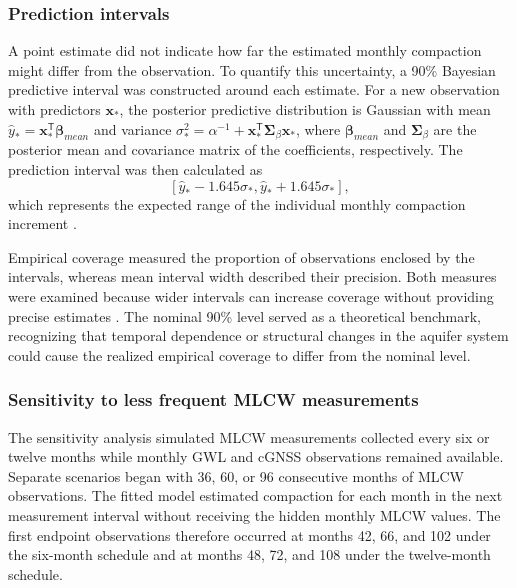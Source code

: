 \subsubsection{Prediction intervals}
\label{subsec:uncertainty}

A point estimate did not indicate how far the estimated monthly compaction might differ from the observation. To quantify this uncertainty, a 90\% Bayesian predictive interval was constructed around each estimate. For a new observation with predictors $\boldsymbol{x}_{*}$, the posterior predictive distribution is Gaussian with mean $\widehat{y}_{*} = \boldsymbol{x}_{*}^{\mathsf{T}}\boldsymbol{\beta}_{mean}$ and variance $\sigma_{*}^{2} = \alpha^{-1} + \boldsymbol{x}_{*}^{\mathsf{T}}\boldsymbol{\Sigma}_{\beta}\boldsymbol{x}_{*}$, where $\boldsymbol{\beta}_{mean}$ and $\boldsymbol{\Sigma}_{\beta}$ are the posterior mean and covariance matrix of the coefficients, respectively. The prediction interval was then calculated as
\begin{equation}
\left[
\widehat{y}_{*}-1.645\sigma_{*},
\widehat{y}_{*}+1.645\sigma_{*}
\right],
\label{eq:prediction_interval}
\end{equation}
which represents the expected range of the individual monthly compaction increment \citep{mackay_bayesian_1992}.

Empirical coverage measured the proportion of observations enclosed by the intervals, whereas mean interval width described their precision. Both measures were examined because wider intervals can increase coverage without providing precise estimates \citep{singh_uncertainty_2024}. The nominal 90\% level served as a theoretical benchmark, recognizing that temporal dependence or structural changes in the aquifer system could cause the realized empirical coverage to differ from the nominal level.

\subsubsection{Sensitivity to less frequent MLCW measurements}
\label{subsec:sparse_measurement_sensitivity}

The sensitivity analysis simulated MLCW measurements collected every six or twelve months while monthly GWL and cGNSS observations remained available. Separate scenarios began with 36, 60, or 96 consecutive months of MLCW observations. The fitted model estimated compaction for each month in the next measurement interval without receiving the hidden monthly MLCW values. The first endpoint observations therefore occurred at months 42, 66, and 102 under the six-month schedule and at months 48, 72, and 108 under the twelve-month schedule.

